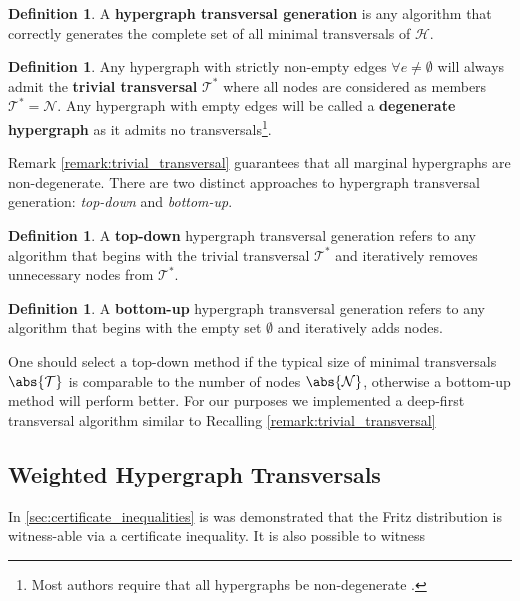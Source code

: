 \documentclass[aps, 10pt, english, twoside, pra, nofootinbib, longbibliography]{revtex4-1}
\theoremstyle{plain}
\theoremstyle{definition}
\newtheorem{definition}[theorem]{Definition}
\theoremstyle{remark}
\newcommand{\nodes}{\mathcal{N}}
\newcommand{\trans}{\mathcal{T}}
\newcommand{\term}[1]{\textcolor{Mahogany}{\textbf{#1}}}
\begin{document}
    \begin{definition}
        A \term{hypergraph transversal generation} is any algorithm that correctly generates the complete set of all minimal transversals of $\mathcal{H}$.
    \end{definition}

    \begin{definition}
        Any hypergraph with strictly non-empty edges $\forall e \neq \emptyset$ will always admit the \term{trivial transversal} $\trans^*$ where all nodes are considered as members $\trans^* = \nodes$. Any hypergraph with empty edges will be called a \term{degenerate hypergraph} as it admits no transversals\footnote{Most authors require that all hypergraphs be non-degenerate \cite{Kavvadias_2005}.}.
    \end{definition}
    Remark \ref{remark:trivial_transversal} guarantees that all marginal hypergraphs are non-degenerate. There are two distinct approaches to hypergraph transversal generation: \textit{top-down} and \textit{bottom-up}.
    \begin{definition}
        A \term{top-down} hypergraph transversal generation refers to any algorithm that begins with the trivial transversal $\trans^*$ and iteratively removes unnecessary nodes from $\trans^*$.
    \end{definition}

    \begin{definition}
        A \term{bottom-up} hypergraph transversal generation refers to any algorithm that begins with the empty set $\emptyset$ and iteratively adds nodes.
    \end{definition}

    One should select a top-down method if the typical size of minimal transversals $\abs{\trans}$ is comparable to the number of nodes $\abs{\nodes}$, otherwise a bottom-up method will perform better.
    For our purposes we implemented a deep-first transversal algorithm similar to
    Recalling \cref{remark:trivial_transversal}

    \subsection{Weighted Hypergraph Transversals}
    In \cref{sec:certificate_inequalities} is was demonstrated that the Fritz distribution is witness-able via a certificate inequality. It is also possible to witness
\end{document}
